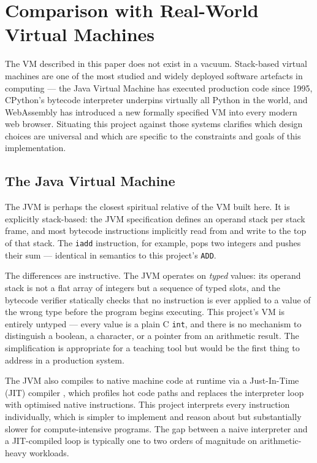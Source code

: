 \section{Comparison with Real-World Virtual Machines}

The VM described in this paper does not exist in a vacuum. Stack-based virtual machines are one of the most studied and widely deployed software artefacts in computing — the Java Virtual Machine \cite{JVMSpec} has executed production code since 1995, CPython's bytecode interpreter \cite{PythonInternals} underpins virtually all Python in the world, and WebAssembly \cite{WasmSpec,WasmSpecification} has introduced a new formally specified VM into every modern web browser. Situating this project against those systems clarifies which design choices are universal and which are specific to the constraints and goals of this implementation.

\subsection{The Java Virtual Machine}

The JVM is perhaps the closest spiritual relative of the VM built here. It is explicitly stack-based: the JVM specification defines an operand stack per stack frame, and most bytecode instructions implicitly read from and write to the top of that stack. The \texttt{iadd} instruction, for example, pops two integers and pushes their sum — identical in semantics to this project's \texttt{ADD}.

The differences are instructive. The JVM operates on \textit{typed} values: its operand stack is not a flat array of integers but a sequence of typed slots, and the bytecode verifier \cite{BytecodeVerification} statically checks that no instruction is ever applied to a value of the wrong type before the program begins executing. This project's VM is entirely untyped — every value is a plain C \texttt{int}, and there is no mechanism to distinguish a boolean, a character, or a pointer from an arithmetic result. The simplification is appropriate for a teaching tool but would be the first thing to address in a production system.

The JVM also compiles to native machine code at runtime via a Just-In-Time (JIT) compiler \cite{JIT1984}, which profiles hot code paths and replaces the interpreter loop with optimised native instructions. This project interprets every instruction individually, which is simpler to implement and reason about but substantially slower for compute-intensive programs. The gap between a naive interpreter and a JIT-compiled loop is typically one to two orders of magnitude on arithmetic-heavy workloads.

